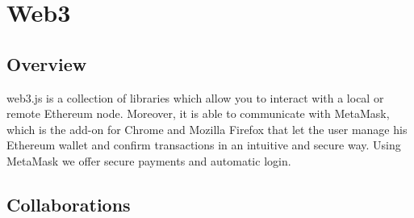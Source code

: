 \section{Web3} 
\subsection{Overview}
web3.js is a collection of libraries which allow you to interact with a local or remote Ethereum node. Moreover, it is able to communicate with MetaMask, which is the add-on for Chrome and Mozilla Firefox that let the user manage his Ethereum wallet and confirm transactions in an intuitive and secure way. Using MetaMask we offer secure payments and automatic login.
\subsection{Collaborations} %